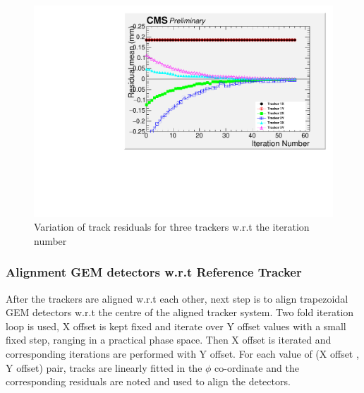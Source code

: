 \begin{figure}[!htbp]
\centering
\includegraphics[width=5.1in]{figures/GEM/Residual_Tracker_Run1897.pdf}
\caption{Variation of track residuals for three trackers  w.r.t the iteration number}\label{fig:resvsit}
\end{figure}




\subsubsection{Alignment GEM detectors w.r.t Reference Tracker}
After the trackers are aligned w.r.t each other, next step is to align trapezoidal GEM detectors w.r.t the centre of the aligned tracker system. Two fold iteration loop is used, X offset is kept fixed and iterate over Y offset values with a small fixed step, ranging in a practical phase space. Then X offset is iterated and corresponding iterations are performed with Y offset. For each value of (X offset , Y offset) pair, tracks are linearly fitted in the $\phi$ co-ordinate and the corresponding residuals are noted and used to align the detectors.


